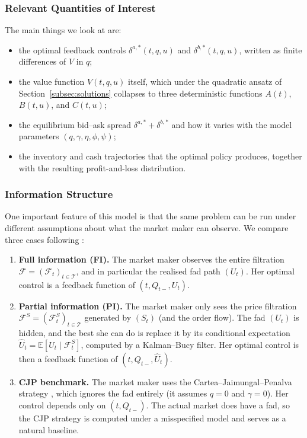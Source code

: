 \documentclass[11pt,a4paper]{article}
\theoremstyle{plain}
\theoremstyle{definition}
\newcommand{\E}{\mathbb{E}}
\newcommand{\F}{\mathcal{F}}
\begin{document}
\subsubsection{Relevant Quantities of Interest}

The main things we look at are:
\begin{itemize}[noitemsep]
  \item the optimal feedback controls $\delta^{a,*}(t,q,u)$ and
        $\delta^{b,*}(t,q,u)$, written as finite differences of $V$ in $q$;
  \item the value function $V(t,q,u)$ itself, which under the quadratic
        ansatz of Section~\ref{subsec:solutions} collapses to three
        deterministic functions $A(t)$, $B(t,u)$, and $C(t,u)$;
  \item the equilibrium bid--ask spread $\delta^{a,*}+\delta^{b,*}$ and
        how it varies with the model parameters $(q,\gamma,\eta,\phi,\psi)$;
  \item the inventory and cash trajectories that the optimal policy
        produces, together with the resulting profit-and-loss distribution.
\end{itemize}

\subsubsection{Information Structure}

One important feature of this model is that the same problem can be run
under different assumptions about what the market maker can observe. We
compare three cases following \cite{barucci2025market}:

\begin{enumerate}[label=(\roman*),noitemsep]
  \item \textbf{Full information (FI).} The market maker observes the
        entire filtration $\F = (\F_t)_{t\in\mathcal{T}}$, and in
        particular the realised fad path $(U_t)$. Her optimal control is a
        feedback function of $(t,Q_{t-},U_t)$.

  \item \textbf{Partial information (PI).} The market maker only sees the
        price filtration $\F^S = (\F^S_t)_{t\in\mathcal{T}}$ generated by
        $(S_t)$ (and the order flow). The fad $(U_t)$ is hidden, and the
        best she can do is replace it by its conditional expectation
        $\hat{U}_t = \E[U_t\mid\F^S_t]$, computed by a Kalman--Bucy
        filter. Her optimal control is then a feedback function of
        $(t,Q_{t-},\hat{U}_t)$.

  \item \textbf{CJP benchmark.} The market maker uses the
        Cartea--Jaimungal--Penalva strategy
        \cite[Chapter 10]{cartea2015algorithmic}, which ignores the fad
        entirely (it assumes $q=0$ and $\gamma=0$). Her control depends
        only on $(t,Q_{t-})$. The actual market does have a fad, so the
        CJP strategy is computed under a misspecified model and serves as
        a natural baseline.
\end{enumerate}
\end{document}
